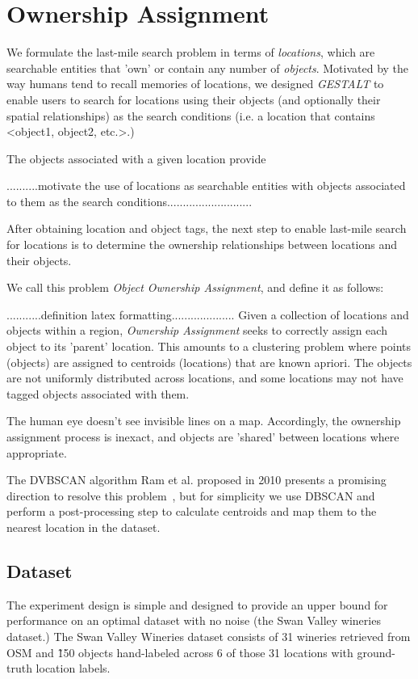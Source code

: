 \section{Ownership Assignment}
\label{section:ownership}


We formulate the last-mile search problem in terms of \textit{locations}, which are searchable entities that 'own' or contain any number of \textit{objects}. Motivated by the way humans tend to recall memories of locations, we designed \emph{GESTALT} to enable users to search for locations using their objects (and optionally their spatial relationships) as the search conditions (i.e. a location that contains <object1, object2, etc.>.)

The objects associated with a given location provide 

..........motivate the use of locations as searchable entities with objects associated to them as the search conditions...........................

After obtaining location and object tags, the next step to enable last-mile search for locations is to determine the ownership relationships between locations and their objects.



We call this problem \textit{Object Ownership Assignment}, and define it as follows:

...........definition latex formatting.................... Given a collection of locations and objects within a region, \emph{Ownership Assignment} seeks to correctly assign each object to its 'parent' location. This amounts to a clustering problem where points (objects) are assigned to centroids (locations) that are known apriori. The objects are not uniformly distributed across locations, and some locations may not have tagged objects associated with them. 


The human eye doesn't see invisible lines on a map. Accordingly, the ownership assignment process is inexact, and objects are 'shared' between locations where appropriate.



The DVBSCAN algorithm Ram et al. proposed in 2010 presents a promising direction to resolve this problem~\cite{Ram2010}, but for simplicity we use DBSCAN and perform a post-processing step to calculate centroids and map them to the nearest location in the dataset. 



\subsection{Dataset}
The experiment design is simple and designed to provide an upper bound for performance on an optimal dataset with no noise (the Swan Valley wineries dataset.) 
The Swan Valley Wineries dataset consists of 31 wineries retrieved from OSM and \~150 objects hand-labeled across 6 of those 31 locations with ground-truth location labels.



